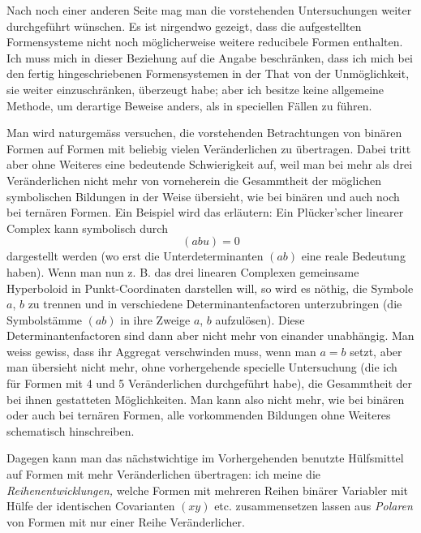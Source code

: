 \documentclass[10pt]{article}
\begin{document}
Nach noch einer anderen Seite mag man die vorstehenden Untersuchungen weiter durchgeführt wünschen. Es ist nirgendwo gezeigt, dass die aufgestellten Formensysteme nicht noch möglicherweise weitere reducibele Formen enthalten. Ich muss mich in dieser Beziehung auf die Angabe beschränken, dass ich mich bei den fertig hingeschriebenen Formensystemen in der That von der Unmöglichkeit, sie weiter einzuschränken, überzeugt habe; aber ich besitze keine allgemeine Methode, um derartige Beweise anders, als in speciellen Fällen zu führen.

Man wird naturgemäss versuchen, die vorstehenden Betrachtungen von binären Formen auf Formen mit beliebig vielen Veränderlichen zu übertragen. Dabei tritt aber ohne Weiteres eine bedeutende Schwierigkeit auf, weil man bei mehr als drei Veränderlichen nicht mehr von vorneherein die Gesammtheit der möglichen symbolischen Bildungen in der Weise übersieht, wie bei binären und auch noch bei ternären Formen. Ein Beispiel wird das erläutern: Ein Plücker'scher linearer Complex kann symbolisch durch
\[
(abu)=0
\]
dargestellt werden (wo erst die Unterdeterminanten $(ab)$ eine reale Bedeutung haben). Wenn man nun z. B. das drei linearen Complexen gemeinsame Hyperboloid in Punkt-Coordinaten darstellen will, so wird es nöthig, die Symbole $a$, $b$ zu trennen und in verschiedene Determinantenfactoren unterzubringen (die Symbolstämme $(ab)$ in ihre Zweige $a$, $b$ aufzulösen). Diese Determinantenfactoren sind dann aber nicht mehr von einander unabhängig. Man weiss gewiss, dass ihr Aggregat verschwinden muss, wenn man $a=b$ setzt, aber man übersieht nicht mehr, ohne vorhergehende specielle Untersuchung (die ich für Formen mit 4 und 5 Veränderlichen durchgeführt habe), die Gesammtheit der bei ihnen gestatteten Möglichkeiten. Man kann also nicht mehr, wie bei binären oder auch bei ternären Formen, alle vorkommenden Bildungen ohne Weiteres schematisch hinschreiben.

Dagegen kann man das nächstwichtige im Vorhergehenden benutzte Hülfsmittel auf Formen mit mehr Veränderlichen übertragen: ich meine die \textit{Reihenentwicklungen,} welche Formen mit mehreren Reihen binärer Variabler mit Hülfe der identischen Covarianten $(xy)$ etc. zusammensetzen lassen aus \textit{Polaren} von Formen mit nur einer Reihe Veränderlicher.
\end{document}
